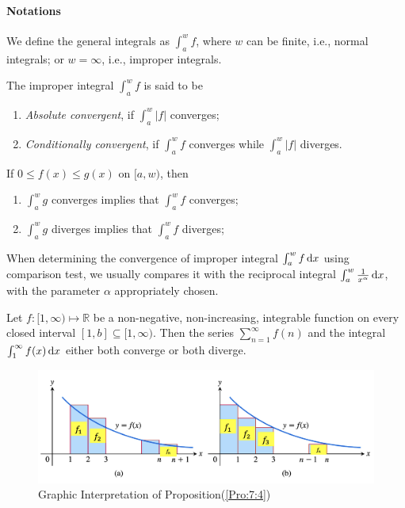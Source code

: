\paragraph{Notations}
We define the general integrals as $\int_a^wf$, where $w$ can be finite, i.e., normal integrals; or $w=\infty$, i.e., improper integrals.
\begin{definition}
The improper integral $\int_a^wf$ is said to be
\begin{enumerate}
\item
\emph{Absolute convergent}, if $\int_a^w|f|$ converges;
\item
\emph{Conditionally convergent}, if $\int_a^wf$ converges while $\int_a^w|f|$ diverges.
\end{enumerate} 
\end{definition}
\begin{proposition}
If $0\le f(x)\le g(x)$ on $[a,w)$, then 
\begin{enumerate}
\item
$\int_a^wg$ converges implies that $\int_a^wf$ converges; 
\item
$\int_a^wg$ diverges implies that $\int_a^wf$ diverges; 
\end{enumerate}
\begin{remark}
When determining the convergence of improper integral $\int_a^wf\,\mathrm{d} x$ using comparison test, we usually compares it with the reciprocal integral $\int_a^w\frac{1}{x^\alpha}\,\mathrm{d} x$, with the parameter $\alpha$ appropriately chosen.
\end{remark}
\end{proposition}
\begin{proposition}\label{Pro:7:4}
Let $f:[1,\infty)\mapsto\mathbb{R}$ be a non-negative, non-increasing, integrable function on every closed interval $[1,b]\subseteq[1,\infty)$. Then the series $\sum_{n=1}^\infty f(n)$ and the integral $\int_1^\infty f(x)\,\mathrm{d} x$ either both converge or both diverge.
\end{proposition}
\begin{figure}[H]
\centering
\includegraphics[width=15cm]{week7/f_1}
\caption{Graphic Interpretation of Proposition(\ref{Pro:7:4})}
\label{Geo_7_1}
\end{figure}

